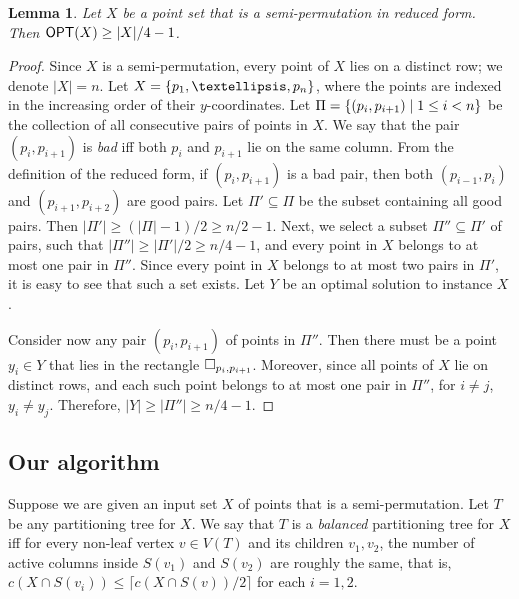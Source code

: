 \documentclass[11pt]{article}
\numberwithin{equation}{section}
\newtheorem{lemma}[theorem]{Lemma}
\theoremstyle{definition}
\theoremstyle{plain}
\begin{document}
\begin{lemma}\label{lem: bound on WB for reduced}
        Let $X$ be a point set that is a semi-permutation in reduced form. Then $\mbox{\sf OPT}(X)\geq |X|/4-1$. 
\end{lemma}
\begin{proof}
Since $X$ is a semi-permutation, every point of $X$ lies on a distinct row; we denote $|X|=n$. Let $X=\set{p_1,\ldots,p_n}$, where the points are indexed in the increasing order of their $y$-coordinates. 
Let $\Pi=\left\{ (p_i,p_{i+1})\mid 1\leq i<n \right\}$ be the collection of all consecutive pairs of points in $X$. We say that the pair $(p_i,p_{i+1})$ is \emph{bad} iff both $p_i$ and $p_{i+1}$ lie on the same column. From the definition of the reduced form, if $(p_i,p_{i+1})$ is a bad pair, then both $(p_{i-1},p_i)$ and $(p_{i+1},p_{i+2})$ are good pairs. Let $\Pi'\subseteq \Pi$ be the subset containing all good pairs. Then $|\Pi'|\geq (|\Pi|-1)/2\geq n/2-1$. Next, we select a subset $\Pi''\subseteq \Pi'$ of pairs, such that $|\Pi''|\geq |\Pi'|/2\geq n/4-1$, and every point in $X$ belongs to at most one pair in $\Pi''$. Since every point in $X$ belongs to at most two pairs in $\Pi'$, it is easy to see that such a set exists. Let $Y$ be an optimal solution to instance $X$.

Consider now any pair $(p_i,p_{i+1})$ of points in $\Pi''$. Then there must be a point $y_i\in Y$ that lies in the rectangle $\Box_{p_i,p_{i+1}}$. Moreover, since all points of $X$ lie on distinct rows, and each such point belongs to at most one pair in $\Pi''$, for $i\neq j$, $y_i\neq y_j$. Therefore, $|Y|\geq |\Pi''|\geq n/4-1$.
\end{proof}





\subsection{Our algorithm} 
\newcommand{\progspace}{\hspace{0.5cm}} 

Suppose we are given an input set $X$ of points that is a semi-permutation. Let $T$ be any partitioning tree for $X$. We say that $T$ is a \emph{balanced} partitioning tree for $X$ iff for every non-leaf vertex $v\in V(T)$ and its children $v_1,v_2$, the number of active columns inside $S(v_1)$ and $S(v_2)$ are roughly the same, that is, $c(X \cap S(v_i)) \leq \lceil c(X\cap S(v))/2 \rceil$ for each $i =1,2$. 

%
\end{document}
